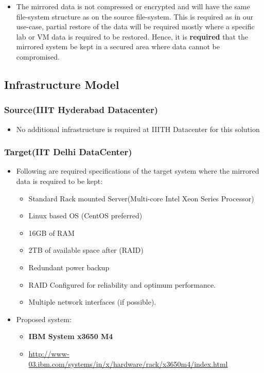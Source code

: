 \documentclass[11pt]{article}
\begin{document}
\begin{itemize}
\item The mirrored data is not compressed or encrypted and will have
      the same file-system structure as on the source
      file-system. This is required as in our use-case, partial
      restore of the data will be required mostly where a specific
      lab or VM data is required to be restored. Hence, it is
      \textbf{required} that the mirrored system be kept in a secured area
      where data cannot be compromised.
\end{itemize}
\subsection{Infrastructure Model}
\label{sec-8.4}

\subsubsection{Source(IIIT Hyderabad Datacenter)}
\label{sec-8.4.1}

\begin{itemize}
\item No additional infrastructure is required at IIITH Datacenter for this solution
\end{itemize}
\subsubsection{Target(IIT Delhi DataCenter)}
\label{sec-8.4.2}

\begin{itemize}
\item Following are required specifications of the target system
       where the mirrored data is required to be kept:

\begin{itemize}
\item Standard Rack mounted Server(Multi-core Intel Xeon Series Processor)
\item Linux based OS (CentOS preferred)
\item 16GB of RAM
\item 2TB of available space after (RAID)
\item Redundant power backup
\item RAID Configured for reliability and optimum performance.
\item Multiple network interfaces (if possible).
\end{itemize}

\item Proposed system:

\begin{itemize}
\item \textbf{IBM System x3650 M4}
\item \href{http://www-03.ibm.com/systems/in/x/hardware/rack/x3650m4/index.html}{http://www-03.ibm.com/systems/in/x/hardware/rack/x3650m4/index.html}
\end{itemize}

\end{itemize}
\end{document}
